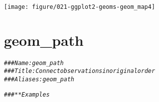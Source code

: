 \documentclass[a4paper,titlepage]{tufte-handout}\usepackage[]{graphicx}\usepackage[]{color}
\makeatletter
\def\maxwidth{ %
  \ifdim\Gin@nat@width>\linewidth
    \linewidth
  \else
    \Gin@nat@width
  \fi
}
\newcommand{\hlcom}[1]{\textcolor[rgb]{0.678,0.584,0.686}{\textit{#1}}}%
\newenvironment{kframe}{%
 \def\at@end@of@kframe{}%
 \ifinner\ifhmode%
  \def\at@end@of@kframe{\end{minipage}}%
  \begin{minipage}{\columnwidth}%
 \fi\fi%
 \def\FrameCommand##1{\hskip\@totalleftmargin \hskip-\fboxsep
 \colorbox{shadecolor}{##1}\hskip-\fboxsep
     \hskip-\linewidth \hskip-\@totalleftmargin \hskip\columnwidth}%
 \MakeFramed {\advance\hsize-\width
   \@totalleftmargin\z@ \linewidth\hsize
   \@setminipage}}%
 {\par\unskip\endMakeFramed%
 \at@end@of@kframe}
\newenvironment{knitrout}{}{} %
\makeatother
\begin{document}
\begin{knitrout}
\begin{kframe}
{\ttfamily\noindent\itshape\color{messagecolor}{\#\# Loading required package: maps}}\end{kframe}
\texttt{[image: figure/021-ggplot2-geoms-geom\_map4]} 
\begin{kframe}\begin{alltt}


\end{alltt}
\end{kframe}
\end{knitrout}



\section{geom\_path}

\begin{knitrout}
\color{fgcolor}\begin{kframe}
\begin{alltt}
\hlcom{### Name: geom_path}
\hlcom{### Title: Connect observations in original order}
\hlcom{### Aliases: geom_path}

\hlcom{### ** Examples}


\end{alltt}
\end{kframe}
\end{knitrout}
\end{document}
